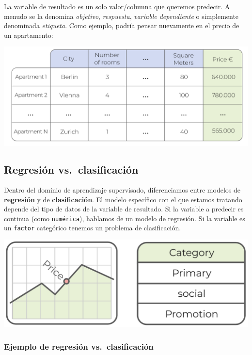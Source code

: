 \documentclass[
]{book}
\begin{document}
La variable de resultado es un solo valor/columna que queremos predecir. A menudo se la denomina \emph{objetivo}, \emph{respuesta}, \emph{variable dependiente} o simplemente denominada \emph{etiqueta}. Como ejemplo, podría pensar nuevamente en el precio de un apartamento:

\includegraphics{img/tab1.png}

\hypertarget{regresiuxf3n-vs.-clasificaciuxf3n}{%
\subsection{Regresión vs.~clasificación}\label{regresiuxf3n-vs.-clasificaciuxf3n}}

Dentro del dominio de aprendizaje supervisado, diferenciamos entre modelos de \textbf{regresión} y de \textbf{clasificación}. El modelo específico con el que estamos tratando depende del tipo de datos de la variable de resultado. Si la variable a predecir es continua (como \texttt{numérica}), hablamos de un modelo de regresión. Si la variable es un \texttt{factor} categórico tenemos un problema de clasificación.

\includegraphics{img/reg.png}

\hypertarget{ejemplo-de-regresiuxf3n-vs.-clasificaciuxf3n}{%
\subsubsection{Ejemplo de regresión vs.~clasificación}\label{ejemplo-de-regresiuxf3n-vs.-clasificaciuxf3n}}
\end{document}
